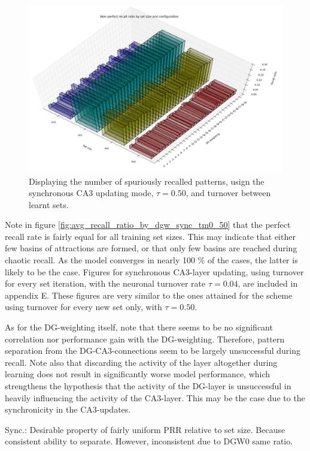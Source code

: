 \begin{figure}
    \centering
    \includegraphics[width=13cm]{fig/DGWs/cut/non_perfect_recall_by_dgw_async_tm0_50_cut}
    \caption{Displaying the number of spuriously recalled patterns, usign the synchronous CA3 updating mode, $\tau=0.50$, and turnover between learnt sets.}
    \label{fig:non_perfect_recall_by_dgw_async_tm0_50}
\end{figure}

Note in figure \ref{fig:avg_recall_ratio_by_dgw_sync_tm0_50} that the perfect recall rate is fairly equal for all training set sizes. This may indicate that either few basins of attractions are formed, or that only few basins are reached during chaotic recall. As the model converges in nearly 100 \% of the cases, the latter is likely to be the case. Figures for synchronous CA3-layer updating, using turnover for every set iteration, with the neuronal turnover rate $\tau=0.04$, are included in appendix E. These figures are very similar to the ones attained for the scheme using turnover for every new set only, with $\tau=0.50$.

As for the DG-weighting itself, note that there seems to be no significant correlation nor performance gain with the DG-weighting. Therefore, pattern separation from the DG-CA3-connections seem to be largely unsuccessful during recall. 
Note also that discarding the activity of the layer altogether during learning does not result in significantly worse model performance, which strengthens the hypothesis that the activity of the DG-layer is unsuccessful in heavily influencing the activity of the CA3-layer. 
This may be the case due to the synchronicity in the CA3-updates.

Sync.: Desirable property of fairly uniform PRR relative to set size. Because consistent ability to separate. However, inconsistent due to DGW0 same ratio.

